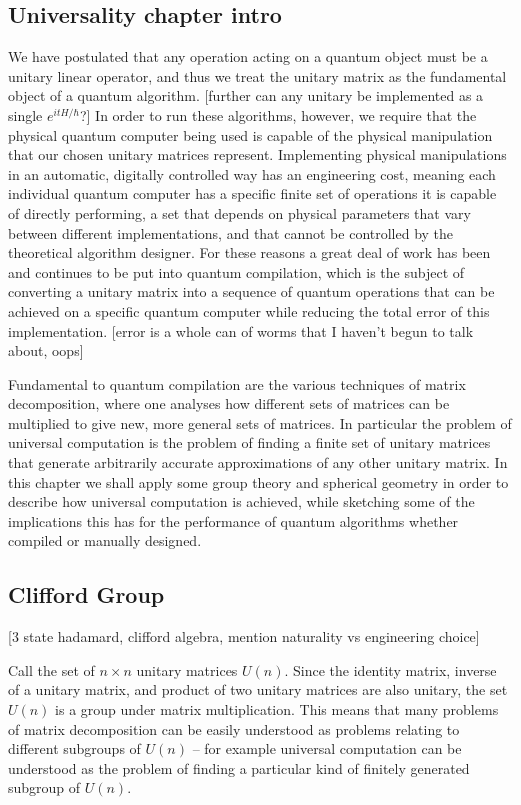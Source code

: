 \documentclass[]{article}
\begin{document}
\subsection{Universality chapter intro}
We have postulated that any operation acting on a quantum object must be a unitary linear operator, and thus we treat the unitary matrix as the fundamental object of a quantum algorithm. [further can any unitary be implemented as a single $e^{itH/\hbar}$?] In order to run these algorithms, however, we require that the physical quantum computer being used is capable of the physical manipulation that our chosen unitary matrices represent. Implementing physical manipulations in an automatic, digitally controlled way has an engineering cost, meaning each individual quantum computer has a specific finite set of operations it is capable of directly performing, a set that depends on physical parameters that vary between different implementations, and that cannot be controlled by the theoretical algorithm designer. For these reasons a great deal of work has been and continues to be put into quantum compilation, which is the subject of converting a unitary matrix into a sequence of quantum operations that can be achieved on a specific quantum computer while reducing the total error of this implementation. [error is a whole can of worms that I haven't begun to talk about, oops]

Fundamental to quantum compilation are the various techniques of matrix decomposition, where one analyses how different sets of matrices can be multiplied to give new, more general sets of matrices. In particular the problem of universal computation is the problem of finding a finite set of unitary matrices that generate arbitrarily accurate approximations of any other unitary matrix. In this chapter we shall apply some group theory and spherical geometry in order to describe how universal computation is achieved, while sketching some of the implications this has for the performance of quantum algorithms whether compiled or manually designed.

\subsection{Clifford Group}
[3 state hadamard, clifford algebra, mention naturality vs engineering choice]

Call the set of $n\times n$ unitary matrices $U(n)$. Since the identity matrix, inverse of a unitary matrix, and product of two unitary matrices are also unitary, the set $U(n)$ is a group under matrix multiplication. This means that many problems of matrix decomposition can be easily understood as problems relating to different subgroups of $U(n)$ -- for example universal computation can be understood as the problem of finding a particular kind of finitely generated subgroup of $U(n)$.
\end{document}
